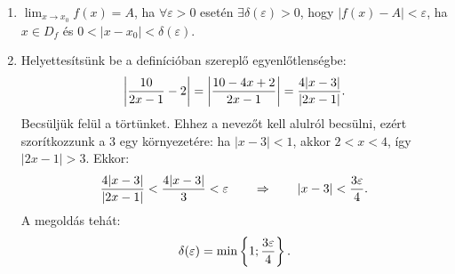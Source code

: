 \documentclass[11pt]{scrartcl}
\begin{document}
\begin{enumerate}
	\item $\displaystyle\lim_{x \to x_0} f(x) = A$, ha
	      $\forall \varepsilon > 0$ esetén $\exists \delta(\varepsilon) > 0$,
	      hogy $|f(x) - A| < \varepsilon$, ha $x \in D_f$ és
	      $0 < |x - x_0| < \delta(\varepsilon)$.

	\item Helyettesítsünk be a definícióban szereplő egyenlőtlenségbe:
	      \[
		      \left| \frac{10}{2x - 1} - 2 \right|
		      = \left| \frac{10 - 4x + 2}{2x - 1} \right|
		      = \frac{4 |x - 3|}{|2x - 1|}
		      \text.
	      \]
	      Becsüljük felül a törtünket. Ehhez a nevezőt kell alulról becsülni,
	      ezért szorítkozzunk a $3$ egy környezetére: ha $|x - 3| < 1$, akkor
	      $2 < x < 4$, így $|2x - 1| > 3$. Ekkor:
	      \[
		      \frac{4 |x - 3|}{|2x - 1|}
		      < \frac{4 |x - 3|}{3}
		      < \varepsilon
		      \qquad \Rightarrow \qquad
		      |x - 3| < \frac{3 \varepsilon}{4}
		      \text.
	      \]
	      A megoldás tehát:
	      \[
		      \delta(\varepsilon) = \min \left\{ 1; \frac{3 \varepsilon}{4} \right\}
		      \text.
	      \]
\end{enumerate}
\end{document}
